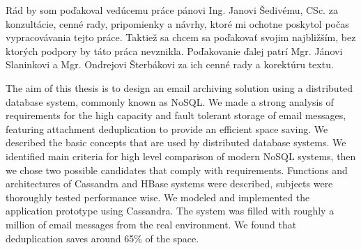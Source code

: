 \documentclass[11pt,twoside,a4paper]{book}
\begin{document}

\coverpagestarts


\acknowledgements
\noindent
Rád by som poďakoval vedúcemu práce pánovi Ing. Janovi Šedivému, CSc. za konzultácie, cenné rady, pripomienky a návrhy, ktoré mi ochotne poskytol počas vypracovávania tejto práce.
Taktiež sa chcem sa poďakovať svojim najbližším, bez ktorých podpory by táto práca nevznikla. Poďakovanie ďalej patrí Mgr. Jánovi Slaninkovi a Mgr. Ondrejovi Šterbákovi za ich cenné rady a korektúru textu.





 
\abstractpage


The aim of this thesis is to design an email archiving solution using a distributed database system, commonly known as NoSQL.
We made a strong analysis of requirements for the high capacity and fault tolerant storage of email messages, featuring attachment deduplication to provide an efficient space saving. We described the basic concepts that are used by distributed database systems. We identified main criteria for high level comparison of modern NoSQL systems, then we chose two possible candidates that comply with requirements. Functions and architectures of Cassandra and HBase systems were described, subjects were thoroughly tested performance wise. We modeled and implemented the application prototype using Cassandra.
The system was filled with roughly a million of email messages from the real environment. We found that deduplication saves around 65\% of the space.
\end{document}
